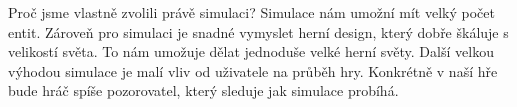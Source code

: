 Proč jsme vlastně zvolili právě simulaci? Simulace nám umožní mít velký počet entit. Zároveň pro simulaci je snadné vymyslet herní design, který dobře škáluje s velikostí světa. To nám umožuje dělat jednoduše velké herní světy. Další velkou výhodou simulace je malí vliv od uživatele na průběh hry. Konkrétně v naší hře bude hráč spíše pozorovatel, který sleduje jak simulace probíhá.

